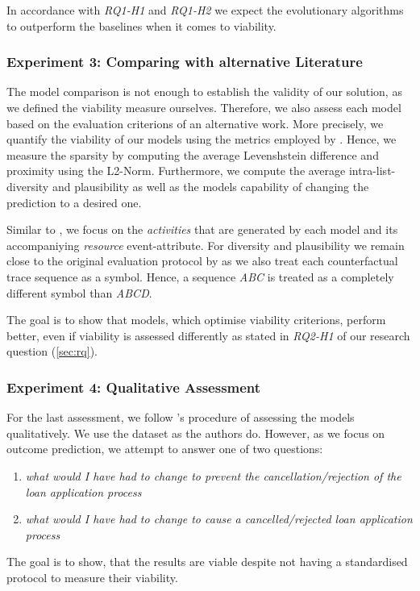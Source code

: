 \documentclass[./../../paper.tex]{subfiles}
\begin{document}
\noindent In accordance with \emph{RQ1-H1} and \emph{RQ1-H2} we expect the evolutionary algorithms to outperform the baselines when it comes to viability.

\subsubsection{Experiment 3: Comparing with alternative Literature}
The model comparison is not enough to establish the validity of our solution, as we defined the viability measure ourselves. Therefore, we also assess each model based on the evaluation criterions of an alternative work. More precisely, we quantify the viability of our models using the metrics employed by \citeauthor{hsieh_DiCE4ELInterpretingProcess_2021}. Hence, we measure the sparsity by computing the average Levenshstein difference and proximity using the L2-Norm. Furthermore, we compute the average intra-list-diversity and plausibility as well as the models capability of changing the prediction to a desired one. 

Similar to \citeauthor{hsieh_DiCE4ELInterpretingProcess_2021}, we focus on the \emph{activities} that are generated by each model and its accompaniying \emph{resource} event-attribute. For diversity and plausibility we remain close to the original evaluation protocol by \citeauthor{hsieh_DiCE4ELInterpretingProcess_2021} as we also treat each counterfactual trace sequence as a symbol. Hence, a sequence \emph{ABC} is treated as a completely different symbol than \emph{ABCD}.

The goal is to show that models, which optimise viability criterions, perform better, even if viability is assessed differently as stated in \emph{RQ2-H1} of our research question (\autoref{sec:rq}). 

\subsubsection{Experiment 4: Qualitative Assessment}
For the last assessment, we follow \citeauthor{hsieh_DiCE4ELInterpretingProcess_2021}'s procedure of assessing the models qualitatively. We use the dataset as the authors do. However, as we focus on outcome prediction, we attempt to answer one of two questions: 

\begin{enumerate}
    \item \emph{what would I have had to change to prevent the cancellation/rejection of the loan application process}
    \item \emph{what would I have had to change to cause a cancelled/rejected loan application process}
\end{enumerate}

The goal is to show, that the results are viable despite not having a standardised protocol to measure their viability.
\end{document}
